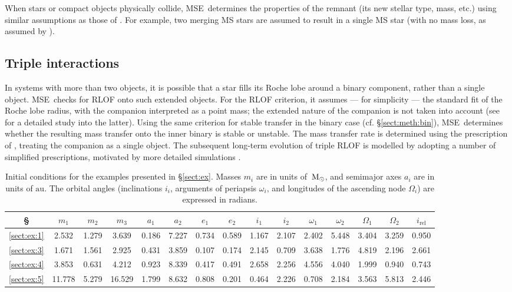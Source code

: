 \documentclass[twocolumn,appendixfloats,tighten]{aastex631}
\def\msun{{\rm\,M_\odot}}
\newcommand{\au}{\mathrm{au}}
\newcommand{\mse}{\textsc{MSE}}
\begin{document}
When stars or compact objects physically collide, \mse~determines the properties of the remnant (its new stellar type, mass, etc.) using similar assumptions as those of \citet{2002MNRAS.329..897H}. For example, two merging MS stars are assumed to result in a single MS star (with no mass loss, as assumed by \citealt{2002MNRAS.329..897H}). 


\subsection{Triple interactions}
\label{sect:meth:tr}
In systems with more than two objects, it is possible that a star fills its Roche lobe around a binary component, rather than a single object. \mse~checks for RLOF onto such extended objects. For the RLOF criterion, it assumes --- for simplicity --- the standard \citet{1983ApJ...268..368E} fit of the Roche lobe radius, with the companion interpreted as a point mass; the extended nature of the companion is not taken into account (see \citealt{2020MNRAS.491..495D} for a detailed study into the latter). Using the same criterion for stable transfer in the binary case (cf. \S\ref{sect:meth:bin}), \mse~determines whether the resulting mass transfer onto the inner binary is stable or unstable. The mass transfer rate is determined using the prescription of \citet{2002MNRAS.329..897H}, treating the companion as a single object. The subsequent long-term evolution of triple RLOF is modelled by adopting a number of simplified prescriptions, motivated by more detailed simulations \citep{2014MNRAS.438.1909D,2020MNRAS.498.2957C,2021MNRAS.500.1921G}. 

\begin{table*}
\begin{center}
\begin{tabular}{ccccccccccccccc}
\toprule 
\S & $m_1$ & $m_2$ & $m_3$ & $a_1$ & $a_2$ & $e_1$ & $e_2$ & $i_1$ & $i_2$ & $\omega_1$ & $\omega_2$ & $\Omega_1$ & $\Omega_2$ & $i_\mathrm{rel}$ \\
\midrule
\ref{sect:ex:1} & 2.532 & 1.279 & 3.639 & 0.186 & 7.227 & 0.734 & 0.589 & 1.167 & 2.107 & 2.402 & 5.448 & 3.404 & 3.259 & 0.950 \\
\ref{sect:ex:3} & 1.671 & 1.561 & 2.925 & 0.431 & 3.859 & 0.107 & 0.174 & 2.145 & 0.709 & 3.638 & 1.776 & 4.819 & 2.196 & 2.661 \\
\ref{sect:ex:4} & 3.853 & 0.631 & 4.212 & 0.923 & 8.339 & 0.417 & 0.491 & 2.658 & 2.256 & 4.556 & 4.040 & 1.999 & 0.940 & 0.743 \\
\ref{sect:ex:5} & 11.778 & 5.279 & 16.529 & 1.799 & 8.632 & 0.808 & 0.201 & 0.464 & 2.226 & 0.708 & 2.184 & 3.563 & 5.813 & 2.446 \\
\bottomrule
\end{tabular}
\end{center}
\caption{Initial conditions for the examples presented in \S\ref{sect:ex}. Masses $m_i$ are in units of $\msun$, and semimajor axes $a_i$ are in units of $\au$. The orbital angles (inclinations $i_i$, arguments of periapsis $\omega_i$, and longitudes of the ascending node $\Omega_i$) are expressed in radians. }
\label{table:exICs}
\end{table*}
\end{document}
